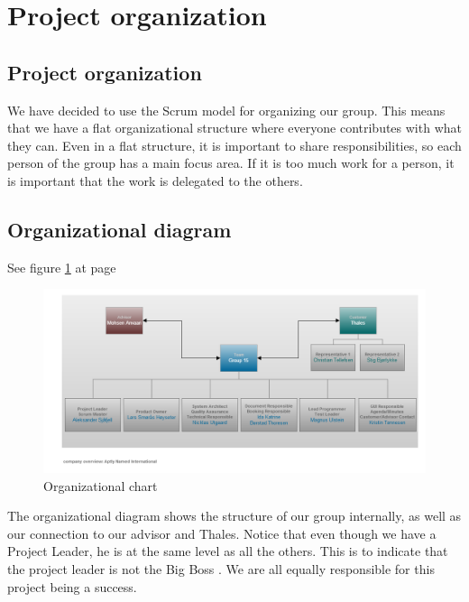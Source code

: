

\section{Project organization}

\subsection{Project organization}
We have decided to use the Scrum model for organizing our group. This means that we have a flat organizational structure where everyone contributes with what they can. Even in a flat structure, it is important to share responsibilities, so each person of the group has a main focus area. If it is too much work for a person, it is important that the work is delegated to the others.

\subsection{Organizational diagram}
See figure \ref{fig:organizationalchart} at page \pageref{fig:organizationalchart}
\begin{figure}
\begin{center}
\includegraphics[width=\textwidth]{Organizational_Chart_v2}
\caption{Organizational chart} \label{fig:organizationalchart}
\end{center}
\end{figure}
The organizational diagram shows the structure of our group internally, as well as our connection to our advisor and Thales. Notice that even though we have a Project Leader, he is at the same level as all the others. This is to indicate that the project leader is not the Big Boss . We are all equally responsible for this project being a success.

